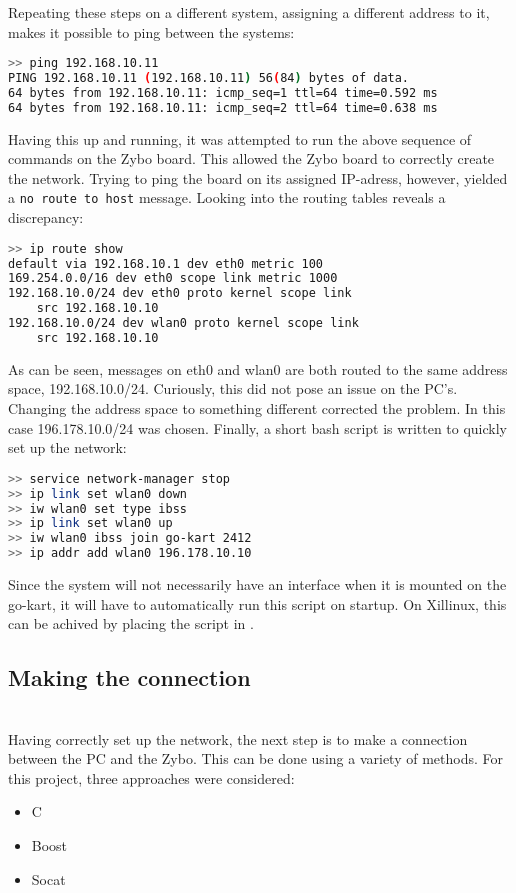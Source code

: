 Repeating these steps on a different system, assigning a different address to it, makes it possible to ping between the systems: 
\begin{lstlisting}[language=bash]
>> ping 192.168.10.11
PING 192.168.10.11 (192.168.10.11) 56(84) bytes of data.
64 bytes from 192.168.10.11: icmp_seq=1 ttl=64 time=0.592 ms
64 bytes from 192.168.10.11: icmp_seq=2 ttl=64 time=0.638 ms
\end{lstlisting}
Having this up and running, it was attempted to run the above sequence of commands on the Zybo board.
This allowed the Zybo board to correctly create the network.
Trying to ping the board on its assigned IP-adress, however, yielded a \texttt{no route to host} message.
Looking into the routing tables reveals a discrepancy:
\begin{lstlisting}[language=bash]
>> ip route show
default via 192.168.10.1 dev eth0 metric 100 
169.254.0.0/16 dev eth0 scope link metric 1000 
192.168.10.0/24 dev eth0 proto kernel scope link 
	src 192.168.10.10 
192.168.10.0/24 dev wlan0 proto kernel scope link 
	src 192.168.10.10
\end{lstlisting}
As can be seen, messages on eth0 and wlan0 are both routed to the same address space, 192.168.10.0/24.
Curiously, this did not pose an issue on the PC's.
Changing the address space to something different corrected the problem.
In this case 196.178.10.0/24 was chosen.
Finally, a short bash script is written to quickly set up the network:
\begin{lstlisting}[language=bash]
>> service network-manager stop
>> ip link set wlan0 down
>> iw wlan0 set type ibss
>> ip link set wlan0 up
>> iw wlan0 ibss join go-kart 2412
>> ip addr add wlan0 196.178.10.10
\end{lstlisting}
Since the system will not necessarily have an interface when it is mounted on the go-kart, it will have to automatically run this script on startup.
On Xillinux, this can be achived by placing the script in .

\subsection{Making the connection}~\\
Having correctly set up the network, the next step is to make a connection between the PC and the Zybo.
This can be done using a variety of methods.
For this project, three approaches were considered:

\begin{itemize}
	\item C
	\item Boost
	\item Socat
\end{itemize}

